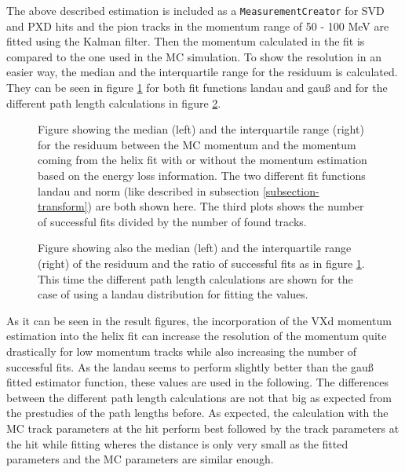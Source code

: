 The above described estimation is included as a \texttt{MeasurementCreator} for SVD and PXD hits and the pion tracks in the momentum range of 50 - 100 MeV are fitted using the Kalman filter. Then the momentum calculated in the fit is compared to the one used in the MC simulation. To show the resolution in an easier way, the median and the interquartile range for the residuum is calculated. They can be seen in figure \ref{fig-results-fit} for both fit functions landau and gauß and for the different path length calculations in figure \ref{fig-results-fit2}.

\begin{figure}
  \centering
  \caption[Residuum of the momentum estimation for different fit functions.]{Figure showing the median (left) and the interquartile range (right) for the residuum between the MC momentum and the momentum coming from the helix fit with or without the momentum estimation based on the energy loss information. The two different fit functions landau and norm (like described in subsection \ref{subsection-transform}) are both shown here. The third plots shows the number of successful fits divided by the number of found tracks.}
  \label{fig-results-fit}
\end{figure}


\begin{figure}
  \centering
  \caption[Residuum of the momentum estimation for different path length calculations.]{Figure showing also the median (left) and the interquartile range (right) of the residuum and the ratio of successful fits as in figure \ref{fig-results-fit}. This time the different path length calculations are shown for the case of using a landau distribution for fitting the \dedx values.}
  \label{fig-results-fit2}
\end{figure}

As it can be seen in the result figures, the incorporation of the VXd momentum estimation into the helix fit can increase the resolution of the momentum quite drastically for low momentum tracks while also increasing the number of successful fits. As the landau seems to perform slightly better than the gauß fitted estimator function, these values are used in the following. The differences between the different path length calculations are not that big as expected from the prestudies of the path lengths before. As expected, the calculation with the MC track parameters at the hit perform best followed by the track parameters at the hit while fitting wheres the distance is only very small as the fitted parameters and the MC parameters are similar enough.

